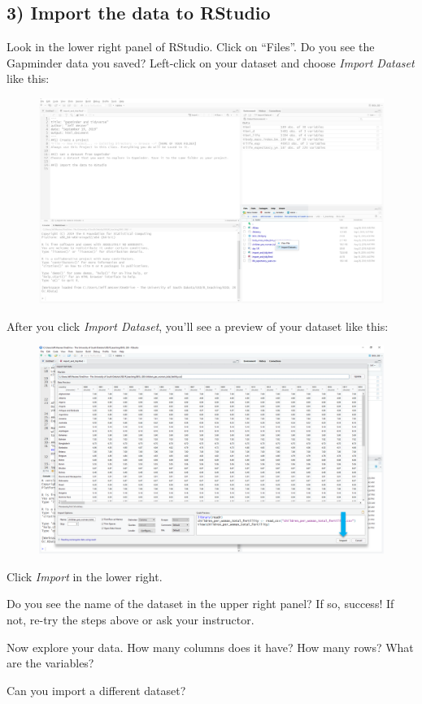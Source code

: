 \documentclass[]{article}
\begin{document}
\subsection{3) Import the data to
RStudio}\label{import-the-data-to-rstudio}

Look in the lower right panel of RStudio. Click on ``Files''. Do you see
the Gapminder data you saved? Left-click on your dataset and choose
\emph{Import Dataset} like this:

\begin{figure}
\centering
\includegraphics{import_example.png}
\caption{}
\end{figure}

After you click \emph{Import Dataset}, you'll see a preview of your
dataset like this:

\begin{figure}
\centering
\includegraphics{import_button.png}
\caption{}
\end{figure}

Click \emph{Import} in the lower right.

Do you see the name of the dataset in the upper right panel? If so,
success! If not, re-try the steps above or ask your instructor.

Now explore your data. How many columns does it have? How many rows?
What are the variables?

Can you import a different dataset?
\end{document}
